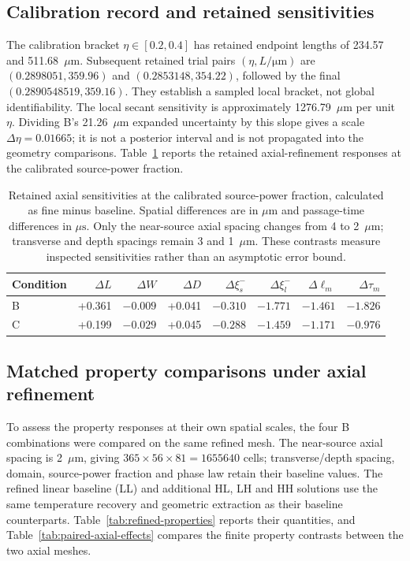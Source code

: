 \documentclass[preprint,12pt]{elsarticle}
\newcommand{\um}{\ensuremath{\mu\mathrm{m}}}
\newcommand{\us}{\ensuremath{\mu\mathrm{s}}}
\begin{document}
\subsection{Calibration record and retained sensitivities}
The calibration bracket $\eta\in[0.2,0.4]$ has retained endpoint lengths of 234.57 and 511.68~\um. Subsequent retained trial pairs $(\eta,L/\mathrm{\mu m})$ are $(0.2898051,359.96)$ and $(0.2853148,354.22)$, followed by the final $(0.2890548519,359.16)$. They establish a sampled local bracket, not global identifiability. The local secant sensitivity is approximately 1276.79~\um{} per unit $\eta$. Dividing B's 21.26~\um{} expanded uncertainty by this slope gives a scale $\Delta\eta=0.01665$; it is not a posterior interval and is not propagated into the geometry comparisons. Table~\ref{tab:axial-sensitivity} reports the retained axial-refinement responses at the calibrated source-power fraction.
\begin{table}[htbp]
\centering
\caption{Retained axial sensitivities at the calibrated source-power fraction, calculated as fine minus baseline. Spatial differences are in \um{} and passage-time differences in \us. Only the near-source axial spacing changes from 4 to 2~\um; transverse and depth spacings remain 3 and 1~\um. These contrasts measure inspected sensitivities rather than an asymptotic error bound.}
\label{tab:axial-sensitivity}
\begin{tabular}{lrrrrrrr}
\toprule
Condition & $\Delta L$ & $\Delta W$ & $\Delta D$ & $\Delta\xi_s^-$ & $\Delta\xi_l^-$ & $\Delta\ell_m$ & $\Delta\tau_m$\\
\midrule
B & +0.361 & $-0.009$ & +0.041 & $-0.310$ & $-1.771$ & $-1.461$ & $-1.826$\\
C & +0.199 & $-0.029$ & +0.045 & $-0.288$ & $-1.459$ & $-1.171$ & $-0.976$\\
\bottomrule
\end{tabular}
\end{table}

\subsection{Matched property comparisons under axial refinement}
To assess the property responses at their own spatial scales, the four B combinations were compared on the same refined mesh. The near-source axial spacing is 2~\um, giving $365\times56\times81=1655640$ cells; transverse/depth spacing, domain, source-power fraction and phase law retain their baseline values. The refined linear baseline (LL) and additional HL, LH and HH solutions use the same temperature recovery and geometric extraction as their baseline counterparts. Table~\ref{tab:refined-properties} reports their quantities, and Table~\ref{tab:paired-axial-effects} compares the finite property contrasts between the two axial meshes.
\end{document}
